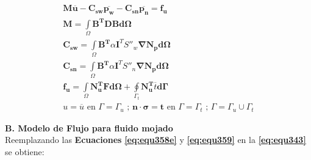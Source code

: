 \begin{ceqn} 
\begin{subequations} \label{eq:equ365} 
\begin{gather}
\mathbf{M}\mathbf{\overline{u}} - \mathbf{C_{sw}}\mathbf{\overline{p_w}} - \mathbf{C_{sn}}\mathbf{\overline{p_n}} = \mathbf{f_u}\label{eq:equ365a}\\[12pt]
\mathbf{M} = \int\limits_\Omega \mathbf{B^T}\mathbf{D}\mathbf{B}\mathbf{d\Omega} \label{eq:equ365b}\\[12pt]
\mathbf{C_{sw}} =  \int\limits_\Omega \mathbf{B^T} \alpha\mathbf{I}^TS''_w\mathbf{\nabla}\mathbf{N_p}\mathbf{d\Omega} \label{eq:equ365c}\\[12pt]
\mathbf{C_{sn}} =  \int\limits_\Omega \mathbf{B^T} \alpha\mathbf{I}^TS''_n\mathbf{\nabla}\mathbf{N_p}\mathbf{d\Omega} \label{eq:equ365d}\\[12pt]
\mathbf{f_u} = \int\limits_\Omega \mathbf{N_{u}^T}\mathbf{F}\mathbf{d\Omega} + \oint\limits_{\Gamma_{t}}  \mathbf{N_{u}^T} \overline{t} \mathbf{d\Gamma} \label{eq:equ365e}\\[12pt]
u = \overline{u} \text{  en  } \Gamma = \Gamma_u \text{ ;  } \mathbf{n}\cdot\mathbf{\sigma}=\mathbf{t} \text{  en  } \Gamma = \Gamma_t \text{ ; } \Gamma = \Gamma_u \cup \Gamma_t \label{eq:equ365f}
\end{gather}  
\end{subequations} 
\end{ceqn}

\bigskip
\textbf{B. Modelo de Flujo para fluido mojado}\\
Reemplazando las \textbf{Ecuaciones} \textbf{\ref{eq:equ358e}} y \textbf{\ref{eq:equ359}} en la \textbf{\ref{eq:equ343}} se obtiene:\bigskip

